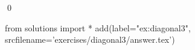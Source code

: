 
\begin{ex} 
  \label{ex:diagonal3}
  
  \qed
\end{ex} 
\begin{python0}
from solutions import *
add(label="ex:diagonal3",
    srcfilename='exercises/diagonal3/answer.tex') 
\end{python0}
